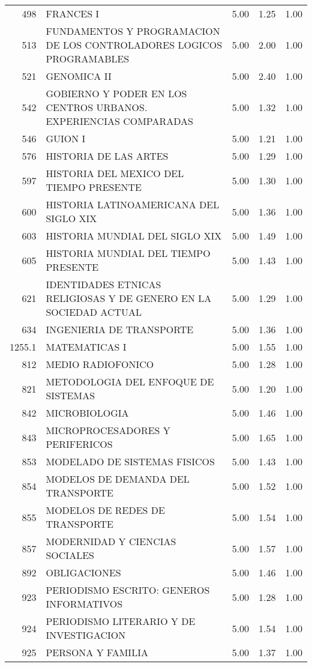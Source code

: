\documentclass[12pt]{article}
\begin{document}
\begin{table}[ht]
\begin{tabular}{rlrrr}
  498 & FRANCES I & 5.00 & 1.25 & 1.00 \\ 
  513 & FUNDAMENTOS Y PROGRAMACION DE LOS CONTROLADORES LOGICOS PROGRAMABLES & 5.00 & 2.00 & 1.00 \\ 
  521 & GENOMICA II & 5.00 & 2.40 & 1.00 \\ 
  542 & GOBIERNO Y PODER EN LOS CENTROS URBANOS. EXPERIENCIAS COMPARADAS & 5.00 & 1.32 & 1.00 \\ 
  546 & GUION I & 5.00 & 1.21 & 1.00 \\ 
  576 & HISTORIA DE LAS ARTES & 5.00 & 1.29 & 1.00 \\ 
  597 & HISTORIA DEL MEXICO DEL TIEMPO PRESENTE & 5.00 & 1.30 & 1.00 \\ 
  600 & HISTORIA LATINOAMERICANA DEL SIGLO XIX & 5.00 & 1.36 & 1.00 \\ 
  603 & HISTORIA MUNDIAL DEL SIGLO XIX & 5.00 & 1.49 & 1.00 \\ 
  605 & HISTORIA MUNDIAL DEL TIEMPO PRESENTE & 5.00 & 1.43 & 1.00 \\ 
  621 & IDENTIDADES ETNICAS RELIGIOSAS Y DE GENERO EN LA SOCIEDAD ACTUAL & 5.00 & 1.29 & 1.00 \\ 
  634 & INGENIERIA DE TRANSPORTE & 5.00 & 1.36 & 1.00 \\ 
  1255.1 & MATEMATICAS I & 5.00 & 1.55 & 1.00 \\ 
  812 & MEDIO RADIOFONICO & 5.00 & 1.28 & 1.00 \\ 
  821 & METODOLOGIA DEL ENFOQUE DE SISTEMAS & 5.00 & 1.20 & 1.00 \\ 
  842 & MICROBIOLOGIA & 5.00 & 1.46 & 1.00 \\ 
  843 & MICROPROCESADORES Y PERIFERICOS & 5.00 & 1.65 & 1.00 \\ 
  853 & MODELADO DE SISTEMAS FISICOS & 5.00 & 1.43 & 1.00 \\ 
  854 & MODELOS DE DEMANDA DEL TRANSPORTE & 5.00 & 1.52 & 1.00 \\ 
  855 & MODELOS DE REDES DE TRANSPORTE & 5.00 & 1.54 & 1.00 \\ 
  857 & MODERNIDAD Y CIENCIAS SOCIALES & 5.00 & 1.57 & 1.00 \\ 
  892 & OBLIGACIONES & 5.00 & 1.46 & 1.00 \\ 
  923 & PERIODISMO ESCRITO: GENEROS INFORMATIVOS & 5.00 & 1.28 & 1.00 \\ 
  924 & PERIODISMO LITERARIO Y DE INVESTIGACION & 5.00 & 1.54 & 1.00 \\ 
  925 & PERSONA Y FAMILIA & 5.00 & 1.37 & 1.00 \\ 

\end{tabular}
\end{table}
\end{document}
